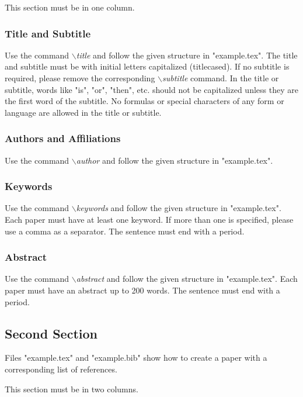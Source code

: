 \documentclass[a4paper,twoside]{article}
\begin{document}
This section must be in one column.

\vfill
\subsubsection{Title and Subtitle}

Use the command \textit{$\backslash$title} and follow the given structure in "example.tex". The title and subtitle must be with initial letters
capitalized (titlecased). If no subtitle is required, please remove the corresponding \textit{$\backslash$subtitle} command. In the title or subtitle, words like "is", "or", "then", etc. should not be capitalized unless they are the first word of the subtitle. No formulas or special characters of any form or language are allowed in the title or subtitle.

\subsubsection{Authors and Affiliations}

Use the command \textit{$\backslash$author} and follow the given structure in "example.tex".

\subsubsection{Keywords}

Use the command \textit{$\backslash$keywords} and follow the given structure in "example.tex". Each paper must have at least one keyword. If more than one is specified, please use a comma as a separator. The sentence must end with a period.

\subsubsection{Abstract}

Use the command \textit{$\backslash$abstract} and follow the given structure in "example.tex".
Each paper must have an abstract up to 200 words. The sentence
must end with a period.

\subsection{Second Section}

Files "example.tex" and "example.bib" show how to create a paper
with a corresponding list of references.

This section must be in two columns.
\end{document}
